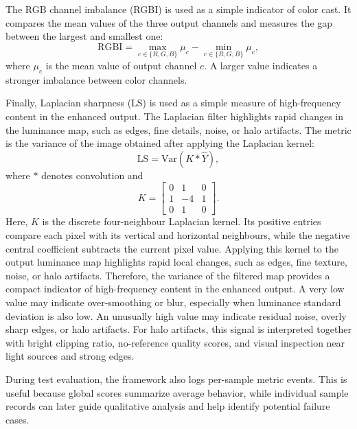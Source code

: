 The RGB channel imbalance (RGBI) is used as a simple indicator of color cast. It compares the mean values of the three output channels and measures the gap between the largest and smallest one:
\begin{equation}
	\mathrm{RGBI}
	=
	\max_{c \in \{R,G,B\}} \mu_c
	-
	\min_{c \in \{R,G,B\}} \mu_c,
	\label{eq:rgbi}
\end{equation}
where $\mu_c$ is the mean value of output channel $c$. A larger value indicates a stronger imbalance between color channels.

Finally, Laplacian sharpness (LS) is used as a simple measure of high-frequency content in the enhanced output. The Laplacian filter highlights rapid changes in the luminance map, such as edges, fine details, noise, or halo artifacts. The metric is the variance of the image obtained after applying the Laplacian kernel:
\begin{equation}
	\mathrm{LS}
	=
	\mathrm{Var}(K \ast \hat{Y}),
	\label{eq:laplacian_sharpness}
\end{equation}
where $\ast$ denotes convolution and
\begin{equation}
	K =
	\begin{bmatrix}
		0 & 1 & 0 \\
		1 & -4 & 1 \\
		0 & 1 & 0
	\end{bmatrix}.
	\label{eq:laplacian_kernel}
\end{equation}
Here, $K$ is the discrete four-neighbour Laplacian kernel. Its positive entries compare each pixel with its vertical and horizontal neighbours, while the negative central coefficient subtracts the current pixel value. Applying this kernel to the output luminance map highlights rapid local changes, such as edges, fine texture, noise, or halo artifacts. Therefore, the variance of the filtered map provides a compact indicator of high-frequency content in the enhanced output. A very low value may indicate over-smoothing or blur, especially when luminance standard deviation is also low. An unusually high value may indicate residual noise, overly sharp edges, or halo artifacts. For halo artifacts, this signal is interpreted together with bright clipping ratio, no-reference quality scores, and visual inspection near light sources and strong edges.

During test evaluation, the framework also logs per-sample metric events. This is useful because global scores summarize average behavior, while individual sample records can later guide qualitative analysis and help identify potential failure cases.

